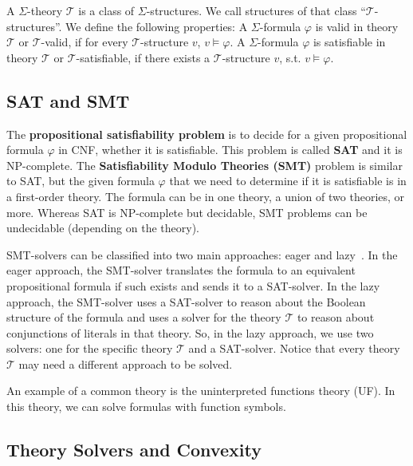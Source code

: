 \documentclass[12pt,a4paper]{article}
\newcommand{\T}{\mathcal{T}}
\theoremstyle{definition}
\begin{document}
A $\Sigma$-theory $\T$ is a class of $\Sigma$-structures. We call structures of that
class ``$\T$-structures''. We define the following properties: A $\Sigma$-formula
$\varphi$ is valid in theory $\T$ or $\T$-valid, if for every $\T$-structure $v$,
$v \models \varphi$. A $\Sigma$-formula $\varphi$ is satisfiable in theory $\T$ or
$\T$-satisfiable, if there exists a $\T$-structure $v$, s.t. $v \models \varphi$.

\subsection{SAT and SMT}

The \textbf{propositional satisfiability problem} is to decide for a given
propositional formula $\varphi$ in CNF, whether it is satisfiable. This problem is
called \textbf{SAT} and it is NP-complete. The \textbf{Satisfiability Modulo
Theories (SMT)} problem is similar to SAT, but the given formula $\varphi$ that we
need to determine if it is satisfiable is in a first-order theory. The formula can
be in one theory, a union of two theories, or more. Whereas SAT is NP-complete but
decidable, SMT problems can be undecidable (depending on the theory).

SMT-solvers can be classified into two main approaches: eager and
lazy~\cite{BarrettSST21}. In the eager approach, the SMT-solver translates the
formula to an equivalent propositional formula if such exists and sends it to a
SAT-solver. In the lazy approach, the SMT-solver uses a SAT-solver to reason about
the Boolean structure of the formula and uses a solver for the theory $\T$ to
reason about conjunctions of literals in that theory. So, in the lazy approach, we
use two solvers: one for the specific theory $\T$ and a SAT-solver. Notice that
every theory $\T$ may need a different approach to be solved.

An example of a common theory is the uninterpreted functions theory (UF). In this
theory, we can solve formulas with function symbols.

\subsection{Theory Solvers and Convexity}
\end{document}
